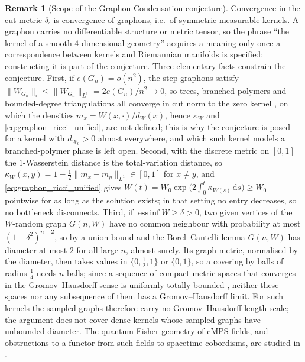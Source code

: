 \documentclass[11pt,a4paper,reqno]{amsart}
\theoremstyle{definition}
\newtheorem{remark}[theorem]{Remark}
\numberwithin{equation}{section}
\providecommand{\cutnorm}[1]{\|#1\|_{\square}}
\newcommand{\dif}{\,\mathrm{d}}
\providecommand{\cutnorm}[1]{\|#1\|_{\square}}
\begin{document}
\begin{remark}[Scope of the Graphon Condensation conjecture]
\label{rem:graphon_scope}
Convergence in the cut metric $\delta_\square$ is convergence of graphons, i.e.\ of symmetric measurable kernels. A graphon carries no differentiable structure or metric tensor, so the phrase ``the kernel of a smooth $4$-dimensional geometry'' acquires a meaning only once a correspondence between kernels and Riemannian manifolds is specified; constructing it is part of the conjecture. Three elementary facts constrain the conjecture. First, if $e(G_n) = o(n^2)$, the step graphons satisfy $\cutnorm{W_{G_n}} \le \|W_{G_n}\|_{L^1} = 2e(G_n)/n^2 \to 0$, so trees, branched polymers and bounded-degree triangulations all converge in cut norm to the zero kernel \cite{borgs2008convergent}, on which the densities $m_x = W(x,\cdot)/d_W(x)$, hence $\kappa_W$ and \eqref{eq:graphon_ricci_unified}, are not defined; this is why the conjecture is posed for a kernel with $d_{W_0} > 0$ almost everywhere, and which such kernel models a branched-polymer phase is left open. Second, with the discrete metric on $[0,1]$ the $1$-Wasserstein distance is the total-variation distance, so $\kappa_W(x,y) = 1 - \tfrac12\|m_x - m_y\|_{L^1} \in [0,1]$ for $x \ne y$, and \eqref{eq:graphon_ricci_unified} gives $W(t) = W_0 \exp\bigl(2\int_0^t \kappa_{W(s)}\dif s\bigr) \ge W_0$ pointwise for as long as the solution exists; in that setting no entry decreases, so no bottleneck disconnects. Third, if $\operatorname{ess\,inf} W \ge \delta > 0$, two given vertices of the $W$-random graph $G(n,W)$ have no common neighbour with probability at most $(1-\delta^2)^{n-2}$, so by a union bound and the Borel--Cantelli lemma $G(n,W)$ has diameter at most $2$ for all large $n$, almost surely. Its graph metric, normalised by the diameter, then takes values in $\{0,\tfrac12,1\}$ or $\{0,1\}$, so a covering by balls of radius $\tfrac14$ needs $n$ balls; since a sequence of compact metric spaces that converges in the Gromov--Hausdorff sense is uniformly totally bounded \cite{burago2001course}, neither these spaces nor any subsequence of them has a Gromov--Hausdorff limit. For such kernels the sampled graphs therefore carry no Gromov--Hausdorff length scale; the argument does not cover dense kernels whose sampled graphs have unbounded diameter. The quantum Fisher geometry of cMPS fields, and obstructions to a functor from such fields to spacetime cobordisms, are studied in \cite{silvafilho2026cobordisms}.
\end{remark}
\end{document}
